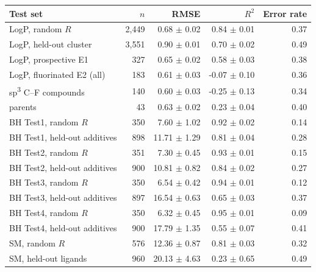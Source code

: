 \begin{tabular}{@{}lrrrr@{}}
\toprule
Test set & $n$ & RMSE & $R^2$ & Error rate \\
\midrule
LogP, random $R$ & 2,449 & 0.68 $\pm$ 0.02 & 0.84 $\pm$ 0.01 & 0.37 \\
LogP, held-out cluster & 3,551 & 0.90 $\pm$ 0.01 & 0.70 $\pm$ 0.02 & 0.49 \\
LogP, prospective E1 & 327 & 0.65 $\pm$ 0.02 & 0.58 $\pm$ 0.03 & 0.38 \\
LogP, fluorinated E2 (all) & 183 & 0.61 $\pm$ 0.03 & -0.07 $\pm$ 0.10 & 0.36 \\
\quad sp\textsuperscript{3} C--F compounds & 140 & 0.60 $\pm$ 0.03 & -0.25 $\pm$ 0.13 & 0.34 \\
\quad parents & 43 & 0.63 $\pm$ 0.02 & 0.23 $\pm$ 0.04 & 0.40 \\
\addlinespace
BH Test1, random $R$ & 350 & 7.60 $\pm$ 1.02 & 0.92 $\pm$ 0.02 & 0.14 \\
BH Test1, held-out additives & 898 & 11.71 $\pm$ 1.29 & 0.81 $\pm$ 0.04 & 0.28 \\
BH Test2, random $R$ & 351 & 7.30 $\pm$ 0.45 & 0.93 $\pm$ 0.01 & 0.15 \\
BH Test2, held-out additives & 900 & 10.81 $\pm$ 0.82 & 0.84 $\pm$ 0.02 & 0.27 \\
BH Test3, random $R$ & 350 & 6.54 $\pm$ 0.42 & 0.94 $\pm$ 0.01 & 0.12 \\
BH Test3, held-out additives & 897 & 16.54 $\pm$ 0.63 & 0.65 $\pm$ 0.03 & 0.37 \\
BH Test4, random $R$ & 350 & 6.32 $\pm$ 0.45 & 0.95 $\pm$ 0.01 & 0.09 \\
BH Test4, held-out additives & 900 & 17.79 $\pm$ 1.35 & 0.55 $\pm$ 0.07 & 0.41 \\
\addlinespace
SM, random $R$ & 576 & 12.36 $\pm$ 0.87 & 0.81 $\pm$ 0.03 & 0.32 \\
SM, held-out ligands & 960 & 20.13 $\pm$ 4.63 & 0.23 $\pm$ 0.65 & 0.49 \\
\bottomrule
\end{tabular}